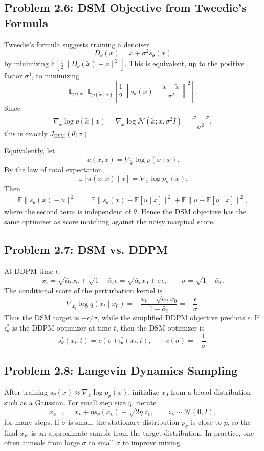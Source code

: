 \documentclass[11pt]{article}
\newcommand{\E}{\mathbb{E}}
\newcommand{\N}{\mathcal{N}}
\newcommand{\Id}{I}
\begin{document}
\subsection*{Problem 2.6: DSM Objective from Tweedie's Formula}
Tweedie's formula suggests training a denoiser
\[
D_\theta(\tilde x)=\tilde x+\sigma^2s_\theta(\tilde x)
\]
by minimizing $\E\left[\frac12\|D_\theta(\tilde x)-x\|^2\right]$.  This is equivalent, up to the positive factor $\sigma^4$, to minimizing
\[
\E_{p(x)}\E_{p(\tilde x\mid x)}
\left[
\frac12\left\|s_\theta(\tilde x)-\frac{x-\tilde x}{\sigma^2}\right\|^2
\right].
\]
Since
\[
\nabla_{\tilde x}\log p(\tilde x\mid x)
=\nabla_{\tilde x}\log \N(\tilde x;x,\sigma^2\Id)
=\frac{x-\tilde x}{\sigma^2},
\]
this is exactly $J_{\mathrm{DSM}}(\theta;\sigma)$.

Equivalently, let
\[
u(x,\tilde x)=\nabla_{\tilde x}\log p(\tilde x\mid x).
\]
By the law of total expectation,
\[
\E[u(x,\tilde x)\mid \tilde x]
=\nabla_{\tilde x}\log p_\sigma(\tilde x).
\]
Then
\begin{align*}
\E\|s_\theta(\tilde x)-u\|^2
&=\E\|s_\theta(\tilde x)-\E[u\mid \tilde x]\|^2
+\E\|u-\E[u\mid \tilde x]\|^2,
\end{align*}
where the second term is independent of $\theta$.  Hence the DSM objective has the same optimizer as score matching against the noisy marginal score.

\subsection*{Problem 2.7: DSM vs. DDPM}
At DDPM time $t$,
\[
x_t=\sqrt{\bar\alpha_t}x_0+\sqrt{1-\bar\alpha_t}\epsilon
=\sqrt{\bar\alpha_t}x_0+\sigma\epsilon,
\qquad \sigma=\sqrt{1-\bar\alpha_t}.
\]
The conditional score of the perturbation kernel is
\[
\nabla_{x_t}\log q(x_t\mid x_0)
=-\frac{x_t-\sqrt{\bar\alpha_t}x_0}{1-\bar\alpha_t}
=-\frac{\epsilon}{\sigma}.
\]
Thus the DSM target is $-\epsilon/\sigma$, while the simplified DDPM objective predicts $\epsilon$.  If $\epsilon_\theta^*$ is the DDPM optimizer at time $t$, then the DSM optimizer is
\[
s_\theta^*(x_t,t)=c(\sigma)\epsilon_\theta^*(x_t,t),
\qquad
c(\sigma)=-\frac{1}{\sigma}.
\]

\subsection*{Problem 2.8: Langevin Dynamics Sampling}
After training $s_\theta(x)\approx \nabla_x\log p_\sigma(x)$, initialize $x_0$ from a broad distribution such as a Gaussian.  For small step size $\eta$, iterate
\[
x_{k+1}=x_k+\eta s_\theta(x_k)+\sqrt{2\eta}\,z_k,
\qquad z_k\sim\N(0,\Id),
\]
for many steps.  If $\sigma$ is small, the stationary distribution $p_\sigma$ is close to $p$, so the final $x_K$ is an approximate sample from the target distribution.  In practice, one often anneals from large $\sigma$ to small $\sigma$ to improve mixing.
\end{document}
